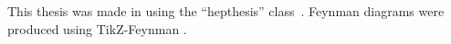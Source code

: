 \begin{colophon}
  This thesis was made in \LaTeXe{} using the ``hepthesis'' class~\cite{hepthesis}.  Feynman diagrams were produced using TikZ-Feynman \cite{Ellis:2016jkw}.
\end{colophon}


%



